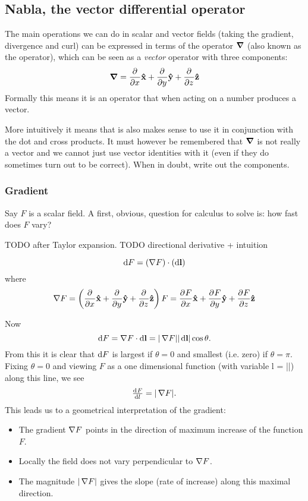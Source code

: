 \subsection{Nabla, the vector differential operator}
The main operations we can do in scalar and vector fields (taking the gradient, divergence and curl) can be expressed in terms of the  operator $\operatorname{\bm{\mathrm{\nabla}}}$ (also known as the  operator), which can be seen as a \textit{vector} operator with three components:
\[ \operatorname{\bm{\mathrm{\nabla}}} =  \frac{\partial{^{}}}{\partial{{x}^{}}} \bm{\mathrm{\hat{x}}} +  \frac{\partial{^{}}}{\partial{{y}^{}}} \bm{\mathrm{\hat{y}}} +  \frac{\partial{^{}}}{\partial{{z}^{}}} \bm{\mathrm{\hat{z}}} \]
Formally this means it is an operator that when acting on a number produces a vector. 

More intuitively it means that is also makes sense to use it in conjunction with the dot and cross products. It must however be remembered that $\operatorname{\bm{\mathrm{\nabla}}}$ is not really a vector and we cannot just use vector identities with it (even if they do sometimes turn out to be correct). When in doubt, write out the components.

\subsubsection{Gradient}
Say $F$ is a scalar field. A first, obvious, question for calculus to solve is: how fast does $F$ vary?

TODO after Taylor expansion. TODO directional derivative + intuition

\[ \operatorname{d \!}{F} = (\mathop{}\! \nabla F)\cdot (\operatorname{d \!}{\bm{\mathrm{l}}}) \]
where
\[ \mathop{}\! \nabla F = \left( \frac{\partial{^{}}}{\partial{{x}^{}}} \bm{\mathrm{\hat{x}}} +  \frac{\partial{^{}}}{\partial{{y}^{}}} \bm{\mathrm{\hat{y}}} +  \frac{\partial{^{}}}{\partial{{z}^{}}} \bm{\mathrm{\hat{z}}}\right)F =  \frac{\partial{^{}}F}{\partial{{x}^{}}} \bm{\mathrm{\hat{x}}} +  \frac{\partial{^{}}F}{\partial{{y}^{}}} \bm{\mathrm{\hat{y}}} +  \frac{\partial{^{}}F}{\partial{{z}^{}}} \bm{\mathrm{\hat{z}}} \]

Now
\[ \operatorname{d \!}{F} = \mathop{}\! \nabla F \cdot \operatorname{d \!}{\bm{\mathrm{l}}} = |\mathop{}\! \nabla F||\operatorname{d \!}{\bm{\mathrm{l}}}|\cos\theta. \]
From this it is clear that $\operatorname{d \!}{F}$ is largest if $\theta = 0$ and smallest (i.e. zero) if $\theta = \pi$. Fixing $\theta = 0$ and viewing $F$ as a one dimensional function (with variable l = ||) along this line, we see
\[ \od{F}{l} = |\grad F|. \]
This leads us to a geometrical interpretation of the gradient:
\begin{itemize}
\item The gradient $\mathop{}\! \nabla F$ points in the direction of maximum increase of the function $F$.
\item Locally the field does not vary perpendicular to $\mathop{}\! \nabla F$.
\item The magnitude $|\mathop{}\! \nabla F|$ gives the slope (rate of increase) along this maximal direction.
\end{itemize}

